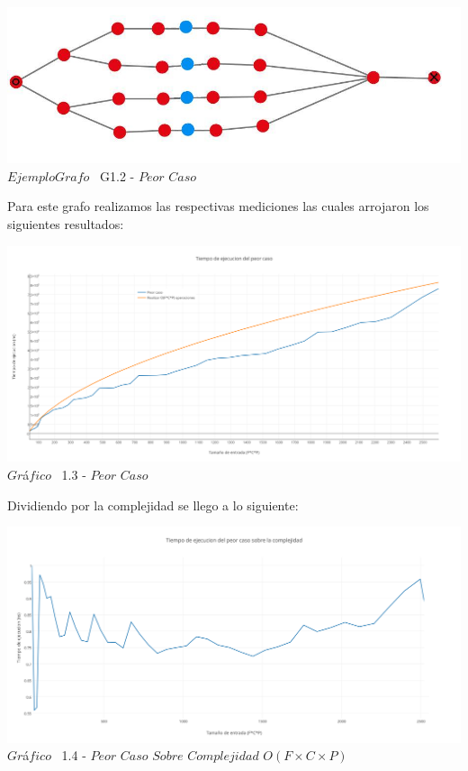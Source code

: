 \vspace*{0.3cm} \vspace*{0.3cm}
  \begin{center}
\includegraphics[scale=0.65]{./EJ1/ej1grafopeorcaso.jpeg}
{$Ejemplo Grafo$ \ G1.2 - $Peor$ $Caso$}
  \end{center}
  \vspace*{0.3cm}

Para este grafo realizamos las respectivas mediciones las cuales arrojaron los siguientes resultados:\\


\vspace*{0.3cm} \vspace*{0.3cm}
  \begin{center}
\includegraphics[scale=0.4]{./EJ1/peorcaso.png}
{$Gr$\'a$fico$ \ 1.3 - $Peor$ $Caso$}
  \end{center}
  \vspace*{0.3cm}

Dividiendo por la complejidad se llego a lo siguiente:\\

\vspace*{0.3cm} \vspace*{0.3cm}
  \begin{center}
\includegraphics[scale=0.5]{./EJ1/peorcaso1.png}
{$Gr$\'a$fico$ \ 1.4 - $Peor$ $Caso$ $Sobre$ $Complejidad$ $O(F \times C \times P)$}
  \end{center}
  \vspace*{0.3cm}

